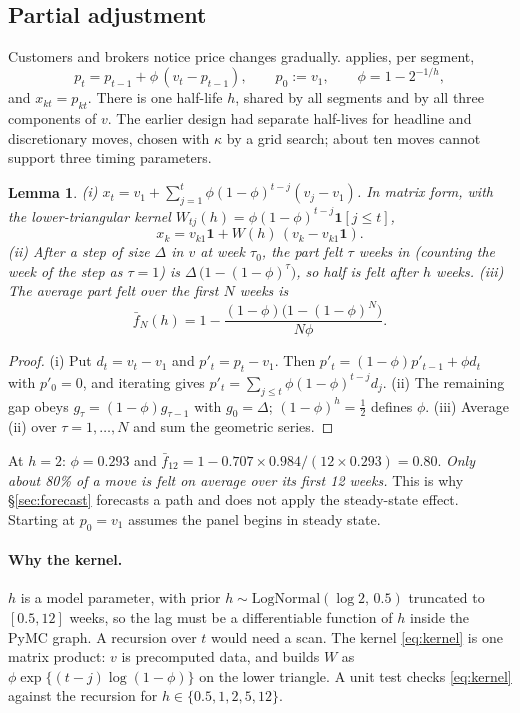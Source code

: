 \documentclass[11pt,a4paper]{article}
\newtheorem{lemma}[proposition]{Lemma}
\theoremstyle{remark}
\newcommand{\code}[1]{\texttt{\detokenize{#1}}}
\newcommand{\one}{\mathbf{1}}
\begin{document}
\subsection{Partial adjustment}
Customers and brokers notice price changes gradually. \code{model.lag} applies, per segment,
\[
p_t=p_{t-1}+\phi\,(v_t-p_{t-1}),\qquad p_0:=v_1,\qquad \phi=1-2^{-1/h},
\]
and $x_{kt}=p_{kt}$. There is one half-life $h$, shared by all segments and by all three components
of $v$. The earlier design had separate half-lives for headline and discretionary moves, chosen with
$\kappa$ by a grid search; about ten moves cannot support three timing parameters.
\begin{lemma}\label{lem:lag}
(i) $x_t=v_1+\sum_{j=1}^{t}\phi(1-\phi)^{t-j}(v_j-v_1)$. In matrix form, with the lower-triangular
kernel $W_{tj}(h)=\phi(1-\phi)^{t-j}\one[j\le t]$,
\begin{equation}\label{eq:kernel}
x_k=v_{k1}\one+W(h)\,(v_k-v_{k1}\one).
\end{equation}
(ii) After a step of size $\Delta$ in $v$ at week $\tau_0$, the part felt $\tau$ weeks in (counting
the week of the step as $\tau=1$) is $\Delta\,\big(1-(1-\phi)^{\tau}\big)$, so half is felt after $h$ weeks.
(iii) The average part felt over the first $N$ weeks is
\[
\bar f_N(h)=1-\frac{(1-\phi)\big(1-(1-\phi)^N\big)}{N\phi}.
\]
\end{lemma}
\begin{proof}
(i) Put $d_t=v_t-v_1$ and $p'_t=p_t-v_1$. Then $p'_t=(1-\phi)p'_{t-1}+\phi d_t$ with $p'_0=0$, and
iterating gives $p'_t=\sum_{j\le t}\phi(1-\phi)^{t-j}d_j$. (ii) The remaining gap obeys
$g_\tau=(1-\phi)g_{\tau-1}$ with $g_0=\Delta$; $(1-\phi)^h=\tfrac12$ defines $\phi$. (iii) Average
(ii) over $\tau=1,\dots,N$ and sum the geometric series.
\end{proof}
At $h=2$: $\phi=0.293$ and $\bar f_{12}=1-0.707\times0.984/(12\times0.293)=0.80$. \emph{Only about
80\% of a move is felt on average over its first 12 weeks.} This is why \S\ref{sec:forecast}
forecasts a path and does not apply the steady-state effect. Starting at $p_0=v_1$ assumes the
panel begins in steady state.

\paragraph{Why the kernel.} $h$ is a model parameter, with prior
$h\sim\mathrm{LogNormal}(\log2,\,0.5)$ truncated to $[0.5,12]$ weeks, so the lag must be a
differentiable function of $h$ inside the PyMC graph. A recursion over $t$ would need a scan. The
kernel \eqref{eq:kernel} is one matrix product: $v$ is precomputed data, and
\code{bayes.lag_kernel_pt} builds $W$ as $\phi\exp\{(t-j)\log(1-\phi)\}$ on the lower triangle. A unit
test checks \eqref{eq:kernel} against the recursion for $h\in\{0.5,1,2,5,12\}$.
\end{document}
